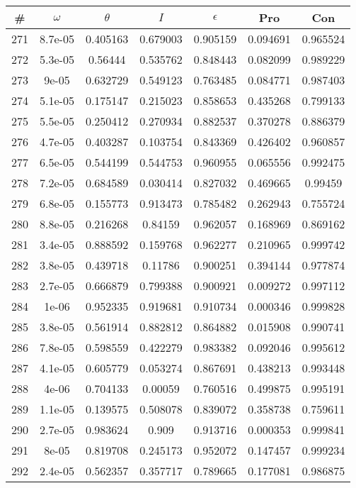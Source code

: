 \newpage
\begin{table}
\begin{tabular}{c|c|c|c|c|c|c}
\# & $\omega$ & $\theta$ & $I$ & $\epsilon$ & Pro & Con\\
\hline
271 & 8.7e-05 & 0.405163 & 0.679003 & 0.905159 & 0.094691 & 0.965524\\
272 & 5.3e-05 & 0.56444 & 0.535762 & 0.848443 & 0.082099 & 0.989229\\
273 & 9e-05 & 0.632729 & 0.549123 & 0.763485 & 0.084771 & 0.987403\\
274 & 5.1e-05 & 0.175147 & 0.215023 & 0.858653 & 0.435268 & 0.799133\\
275 & 5.5e-05 & 0.250412 & 0.270934 & 0.882537 & 0.370278 & 0.886379\\
276 & 4.7e-05 & 0.403287 & 0.103754 & 0.843369 & 0.426402 & 0.960857\\
277 & 6.5e-05 & 0.544199 & 0.544753 & 0.960955 & 0.065556 & 0.992475\\
278 & 7.2e-05 & 0.684589 & 0.030414 & 0.827032 & 0.469665 & 0.99459\\
279 & 6.8e-05 & 0.155773 & 0.913473 & 0.785482 & 0.262943 & 0.755724\\
280 & 8.8e-05 & 0.216268 & 0.84159 & 0.962057 & 0.168969 & 0.869162\\
281 & 3.4e-05 & 0.888592 & 0.159768 & 0.962277 & 0.210965 & 0.999742\\
282 & 3.8e-05 & 0.439718 & 0.11786 & 0.900251 & 0.394144 & 0.977874\\
283 & 2.7e-05 & 0.666879 & 0.799388 & 0.900921 & 0.009272 & 0.997112\\
284 & 1e-06 & 0.952335 & 0.919681 & 0.910734 & 0.000346 & 0.999828\\
285 & 3.8e-05 & 0.561914 & 0.882812 & 0.864882 & 0.015908 & 0.990741\\
286 & 7.8e-05 & 0.598559 & 0.422279 & 0.983382 & 0.092046 & 0.995612\\
287 & 4.1e-05 & 0.605779 & 0.053274 & 0.867691 & 0.438213 & 0.993448\\
288 & 4e-06 & 0.704133 & 0.00059 & 0.760516 & 0.499875 & 0.995191\\
289 & 1.1e-05 & 0.139575 & 0.508078 & 0.839072 & 0.358738 & 0.759611\\
290 & 2.7e-05 & 0.983624 & 0.909 & 0.913716 & 0.000353 & 0.999841\\
291 & 8e-05 & 0.819708 & 0.245173 & 0.952072 & 0.147457 & 0.999234\\
292 & 2.4e-05 & 0.562357 & 0.357717 & 0.789665 & 0.177081 & 0.986875\\

\end{tabular}
\end{table}
